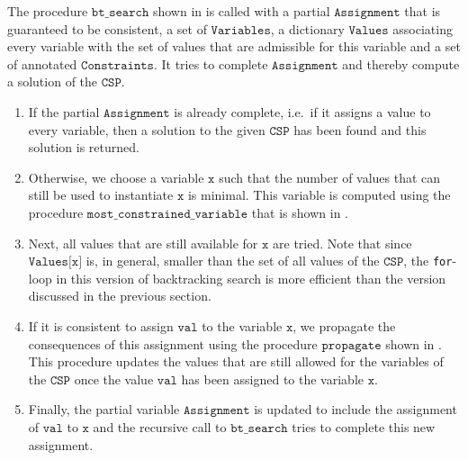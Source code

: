 The procedure $\texttt{bt\_search}$ shown in  is called with a
partial $\texttt{Assignment}$ that is guaranteed to be consistent, a set of $\texttt{Variables}$, a dictionary
$\texttt{Values}$ associating every variable with the set of values that are admissible for this variable and a
set of annotated $\texttt{Constraints}$.  It tries to complete $\texttt{Assignment}$ and thereby compute a
solution of the $\texttt{CSP}$.  
\begin{enumerate}
\item If the partial $\texttt{Assignment}$ is already complete, i.e.~if it assigns a value to every variable, 
      then a solution to the given $\texttt{CSP}$ has been found and this solution is returned.
\item Otherwise, we choose a variable $\texttt{x}$ such that the number of values that can still be used to
      instantiate $\texttt{x}$ is minimal.  This variable is computed using the procedure
      $\texttt{most\_constrained\_variable}$ that is shown in .
\item Next, all values that are still available for $\texttt{x}$ are tried.  Note that since
      $\texttt{Values[x]}$ is, in general, smaller than the set of all values of the $\texttt{CSP}$,
      the \texttt{for}-loop in this version of backtracking search is more efficient than the version discussed
      in the previous section. 
\item If it is consistent to assign $\texttt{val}$ to the variable $\texttt{x}$, we propagate the consequences
      of this assignment using the procedure $\texttt{propagate}$ shown in
      .
      This procedure updates the values that are still allowed for the variables of the $\texttt{CSP}$ once the
      value $\texttt{val}$ has been assigned to the variable $\texttt{x}$.
\item Finally, the partial variable $\texttt{Assignment}$ is updated to include the assignment of 
      $\texttt{val}$ to $\texttt{x}$ and the recursive call to $\texttt{bt\_search}$ tries to complete this new
      assignment. 
\end{enumerate}

